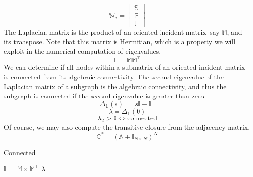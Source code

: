 \documentclass{article}[11pt]
\begin{document}
%
\begin{equation}
\mathbb{W}_{u} = \left[
\begin{array}{c} 
\mathbb{S} \\ \hline
\mathbb{P} \\ \hline
\mathbb{F}
\end{array}
\right]
\label{eq:intermediateMatrix}
\end{equation}
%
The Laplacian matrix is the product of an oriented incident matrix, say $\mathbb{M}$,  and its transpose.  Note that this matrix is Hermitian, which is a property we will exploit in the numerical computation of eigenvalues.
\begin{equation}
\mathbb{L} = \mathbb{M}\mathbb{M}^{\intercal}
\label{eq:laplacianMatrix}
\end{equation}
We can determine if all nodes within a submatrix of an oriented incident matrix is connected from its algebraic connectivity.  The second eigenvalue of the Laplacian matrix of a subgraph is the algebraic connectivity, and thus the subgraph is connected if the second eigenvalue is greater than zero.  
\begin{equation} 
\Delta_{\mathbb{L}}\left(s\right) = | s\mathbb{I} - \mathbb{L} |
\label{eq:characteristicPolynomial}
\end{equation}
\begin{equation} 
\underline{\lambda} = \Delta_{\mathbb{L}}\left(0\right)
\label{eq:eigenvalues}
\end{equation}
\begin{equation} 
\lambda_{2} > 0 \Leftrightarrow \mbox{connected}
\label{eq:eigenvalues}
\end{equation}
%
Of course, we may also compute the transitive closure from the adjacency matrix.
\begin{equation} 
\mathbb{C}^{*} = \left( \mathbb{A} + \mathbb{I}_{N \times N} \right)^{N}
\label{eq:characteristicPolynomial}
\end{equation}
%
%
\begin{algorithm}
\caption{Connected}
\label{alg:connected}
  \State {}
  \State $\mathbb{L} = \mathbb{M} \times \mathbb{M}^{\intercal}$
  \State {}
  \State $\underline{\lambda} = $
    \State {}
    \State {}
  \Else
    \State {}
  \EndIf
\EndFunction
\end{algorithm}
\end{document}
